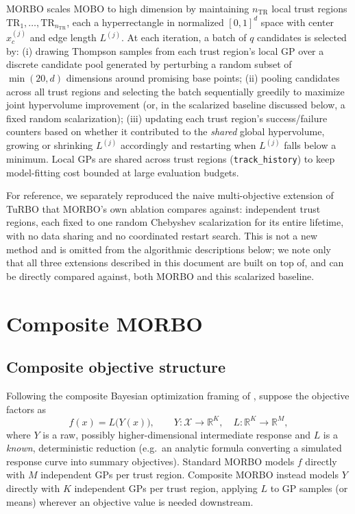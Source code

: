 \documentclass[11pt]{article}
\newcommand{\Reals}{\mathbb{R}}
\newcommand{\X}{\mathcal{X}}
\newcommand{\TR}{\mathrm{TR}}
\begin{document}
MORBO \citep{daulton2022morbo} scales MOBO to high dimension by maintaining
$n_{\TR}$ local trust regions $\TR_1, \dots, \TR_{n_{\TR}}$, each a
hyperrectangle in normalized $[0,1]^d$ space with center $x_c^{(j)}$ and
edge length $L^{(j)}$. At each iteration, a batch of $q$ candidates is
selected by: (i) drawing Thompson samples from each trust region's local
GP over a discrete candidate pool generated by perturbing a random subset
of $\min(20, d)$ dimensions around promising base points; (ii) pooling
candidates across all trust regions and selecting the batch sequentially
greedily to maximize joint hypervolume improvement (or, in the
scalarized baseline discussed below, a fixed random scalarization);
(iii) updating each trust region's success/failure counters based on
whether it contributed to the \emph{shared} global hypervolume, growing
or shrinking $L^{(j)}$ accordingly and restarting when $L^{(j)}$ falls
below a minimum. Local GPs are shared across trust regions
(\texttt{track\_history}) to keep model-fitting cost bounded at large
evaluation budgets.

For reference, we separately reproduced the naive multi-objective
extension of TuRBO \citep{eriksson2019turbo} that MORBO's own ablation
compares against: independent trust regions, each fixed to one random
Chebyshev scalarization for its entire lifetime, with no data sharing and
no coordinated restart search. This is not a new method and is omitted
from the algorithmic descriptions below; we note only that all three
extensions described in this document are built on top of, and can be
directly compared against, both MORBO and this scalarized baseline.

\section{Composite MORBO}
\label{sec:composite}

\subsection{Composite objective structure}

Following the composite Bayesian optimization framing of
\citet{astudillo2019composite}, suppose the objective factors as
\begin{equation}
  f(x) = L\big(Y(x)\big), \qquad Y: \X \to \Reals^K,\quad L: \Reals^K \to \Reals^M,
\end{equation}
where $Y$ is a raw, possibly higher-dimensional intermediate response and
$L$ is a \emph{known}, deterministic reduction (e.g.\ an analytic formula
converting a simulated response curve into summary objectives). Standard
MORBO models $f$ directly with $M$ independent GPs per trust region.
Composite MORBO instead models $Y$ directly with $K$ independent GPs per
trust region, applying $L$ to GP samples (or means) wherever an objective
value is needed downstream.
\end{document}

